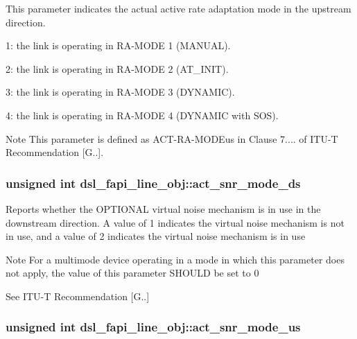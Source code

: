 This parameter indicates the actual active rate adaptation mode in the upstream direction.
\begin{DoxyItemize}
\item 1\-: the link is operating in R\-A-\/\-M\-O\-D\-E 1 (M\-A\-N\-U\-A\-L).
\item 2\-: the link is operating in R\-A-\/\-M\-O\-D\-E 2 (A\-T\-\_\-\-I\-N\-I\-T).
\item 3\-: the link is operating in R\-A-\/\-M\-O\-D\-E 3 (D\-Y\-N\-A\-M\-I\-C).
\item 4\-: the link is operating in R\-A-\/\-M\-O\-D\-E 4 (D\-Y\-N\-A\-M\-I\-C with S\-O\-S). \begin{DoxyNote}{Note}
This parameter is defined as A\-C\-T-\/\-R\-A-\/\-M\-O\-D\-Eus in Clause 7.... of I\-T\-U-\/\-T Recommendation \mbox{[}G..\mbox{]}. 
\end{DoxyNote}

\end{DoxyItemize}\hypertarget{structdsl__fapi__line__obj_a847673509738e19ead5a23922316be96}{
\subsubsection[{act\-\_\-snr\-\_\-mode\-\_\-ds}]{\setlength{\rightskip}{0pt plus 5cm}unsigned int dsl\-\_\-fapi\-\_\-line\-\_\-obj\-::act\-\_\-snr\-\_\-mode\-\_\-ds}}\label{structdsl__fapi__line__obj_a847673509738e19ead5a23922316be96}
Reports whether the O\-P\-T\-I\-O\-N\-A\-L virtual noise mechanism is in use in the downstream direction. A value of 1 indicates the virtual noise mechanism is not in use, and a value of 2 indicates the virtual noise mechanism is in use \begin{DoxyNote}{Note}
For a multimode device operating in a mode in which this parameter does not apply, the value of this parameter S\-H\-O\-U\-L\-D be set to 0 

See I\-T\-U-\/\-T Recommendation \mbox{[}G..\mbox{]} 
\end{DoxyNote}
\hypertarget{structdsl__fapi__line__obj_a52ceef229b988f92bff6977fd32fc143}{
\subsubsection[{act\-\_\-snr\-\_\-mode\-\_\-us}]{\setlength{\rightskip}{0pt plus 5cm}unsigned int dsl\-\_\-fapi\-\_\-line\-\_\-obj\-::act\-\_\-snr\-\_\-mode\-\_\-us}}\label{structdsl__fapi__line__obj_a52ceef229b988f92bff6977fd32fc143}
